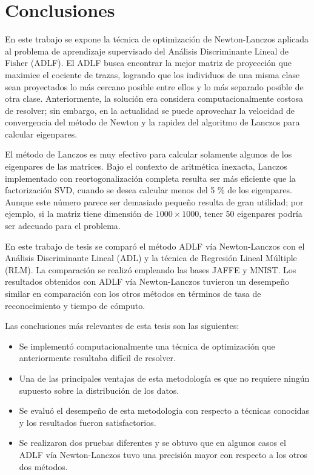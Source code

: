 \chapter{Conclusiones}
\label{ch:conclusion}

En este trabajo se expone la técnica de optimización de Newton-Lanczos aplicada al problema de aprendizaje supervisado del Análisis Discriminante Lineal de Fisher (ADLF). El ADLF busca encontrar la mejor matriz de proyección que maximice el cociente de trazas, logrando que los individuos de una misma clase sean proyectados lo más cercano posible entre ellos y lo más separado posible de otra clase. Anteriormente, la solución era considera computacionalmente costosa de resolver; sin embargo, en la actualidad se puede aprovechar la velocidad de convergencia del método de Newton y la rapidez del algoritmo de Lanczos para calcular eigenpares. 


El método de Lanczos es muy efectivo para calcular solamente algunos de los eigenpares de las matrices. Bajo el contexto de aritmética inexacta, Lanczos implementado con reortogonalización completa resulta ser más eficiente que la factorización SVD, cuando se desea calcular menos del 5 \% de los eigenpares. Aunque este número parece ser demasiado pequeño resulta de gran utilidad; por ejemplo, si la matriz tiene dimensión de $1000 \times 1000$, tener 50 eigenpares podría ser adecuado para el problema. 

\newpage
En este trabajo de tesis se comparó el método ADLF vía Newton-Lanczos con el Análisis Discriminante Lineal (ADL) y la técnica de Regresión Lineal Múltiple (RLM). La comparación se realizó empleando las bases JAFFE y MNIST. Los resultados obtenidos con ADLF vía Newton-Lanczos tuvieron un desempeño similar en comparación con los otros métodos en términos de tasa de reconocimiento y tiempo de cómputo.

Las conclusiones más relevantes de esta tesis son las siguientes:

\begin{itemize}
\item Se implementó computacionalmente una técnica de optimización que anteriormente resultaba difícil de resolver.
\item Una de las principales ventajas de esta metodología es que no requiere ningún supuesto sobre la distribución de los datos.
\item Se evaluó el desempeño de esta metodología con respecto a técnicas conocidas y los resultados fueron satisfactorios.
\item Se realizaron dos pruebas diferentes y se obtuvo que en algunos casos el ADLF vía Newton-Lanczos tuvo una precisión mayor con respecto a los otros dos métodos.
\end{itemize}


